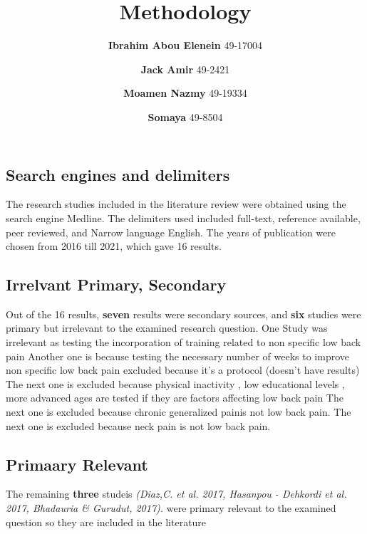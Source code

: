 \documentclass[a4paper]{article}
\theoremstyle{definition}
\begin{document}
\author{
    \textbf{Ibrahim Abou Elenein} 49-17004
  \and
    \textbf{Jack Amir} 49-2421
    \and
    \textbf{Moamen Nazmy} 49-19334
    \and
    \textbf{Somaya} 49-8504
}
\title{\textbf{Methodology}}
\maketitle
\subsection{Search engines and delimiters}
The research studies included in the literature review were
obtained using the search engine Medline. The delimiters used included full-text,
reference available, peer reviewed, and Narrow language English.
The years of publication were chosen from 2016 till 2021, which gave 16
results.

\subsection{Irrelvant Primary, Secondary}

 Out of the 16 results, \textbf{seven} results were  secondary sources, and
\textbf{six} studies were primary
but irrelevant to the examined research question.
One Study was irrelevant as testing the incorporation of training related to non
specific low back pain
Another one is because testing the necessary number of weeks to improve non specific low back pain
excluded because it's a protocol (doesn't have results)
The next one is excluded because physical inactivity , low educational levels , more advanced ages are tested
if they are factors affecting low back pain
The next one is excluded because chronic generalized painis not low back pain.
The next one is excluded because neck pain is not low back pain.
\subsection{Primaary Relevant}
The remaining \textbf{three} studeis
\textit{
    (Diaz,C. et al. 2017,
    Hasanpou - Dehkordi et al. 2017, Bhadauria \& Gurudut, 2017).}
were primary relevant to the
examined question so they are included in the literature
\end{document}
